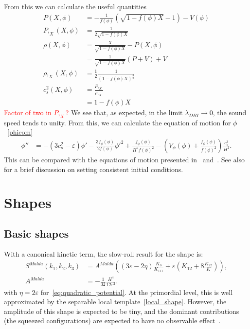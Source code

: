     From this we can calculate the useful quantities
    \begin{align}
        P(X, \phi) &= -\frac{1}{f(\phi)}\left(\sqrt{1-f(\phi)X}-1\right)-V(\phi)\\
        P,_X(X, \phi) &= \frac{1}{2\sqrt{1-f(\phi)X}}\\
        \rho(X, \phi) &= \frac{X}{\sqrt{1-f(\phi)X}}-P(X,\phi)\\
                    &= \frac{1}{\sqrt{1-f(\phi)X}}(P+V)+V\\
        \rho,_X(X, \phi) &= \frac{1}{2}\frac{1}{\left(1-f(\phi)X\right)^{\frac{3}{2}}}\\
        c^2_s(X, \phi) &= \frac{P,_X}{\rho,_X}\\
                    &= 1-f(\phi)X
    \end{align}
    \textcolor{red}{Factor of two in $P,_X$?}
    We see that, as expected, in the limit $\lambda_{DBI}\rightarrow 0$, the sound
    speed tends to unity.
    From this, we can calculate the equation of motion for $\phi$~\eqref{phieom}
    \begin{align}
        \phi'' &= -(3c_s^2-\varepsilon)\phi'
                -\frac{3f_\phi(\phi)}{2f(\phi)}\phi'^2
                +\frac{f_\phi(\phi)}{H^2f(\phi)^2}
                -\left(V_\phi(\phi)+\frac{f_\phi(\phi)}{f(\phi)^2}\right)\frac{c_s^3}{H^2}.
    \end{align}
    This can be compared with the equations of motion presented in~\cite{dbi_silverstein}
    and~\cite{warp_features_dbi}.
    See also~\cite{cmb_pol_ics} for a brief discussion on setting consistent initial conditions.

    \section{Shapes}
    \subsection{Basic shapes}
    With a canonical kinetic term, the slow-roll result for the shape is:
\begin{align}\label{malda_shape}
    S^{Malda}(k_1,k_2,k_3) &= A^{Malda} \left( (3\varepsilon-2\eta)\frac{K_3}{K_{111}}+\varepsilon \left(K_{12}+8\frac{K_{22}}{K}\right) \right),\\
    A^{Malda} &= -\frac{1}{32}\frac{H^4}{12\varepsilon^2}.
\end{align}
with $\eta=2\varepsilon$ for~\eqref{eq:quadratic_potential}.
At the primordial level, this is well approximated by the separable local template~\eqref{local_shape}.
However, the amplitude of this shape is expected to be tiny,
and the dominant contributions (the squeezed configurations) are expected
to have no observable effect~\cite{Cabass_2016}.


